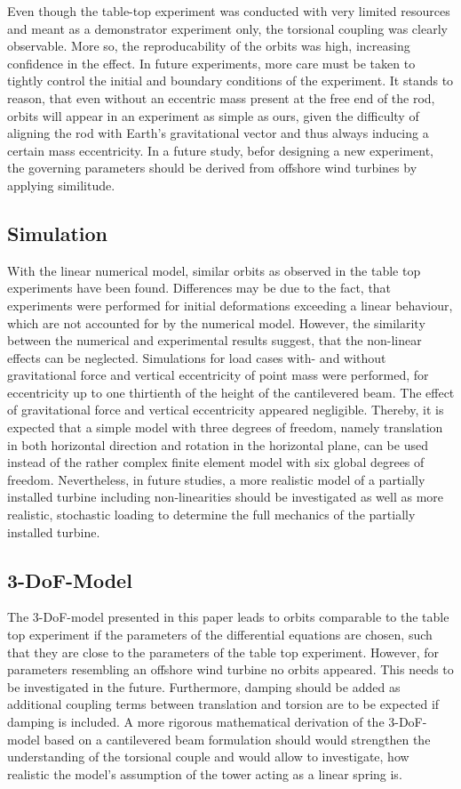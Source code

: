 \documentclass{article}
\begin{document}
Even though the table-top experiment was conducted with very limited resources and meant as a demonstrator experiment only, the torsional coupling was clearly observable. More so, the reproducability of the orbits was high, increasing confidence in the effect. In future experiments, more care must be taken to tightly control the initial and boundary conditions of the experiment. It stands to reason, that even without an eccentric mass present at the free end of the rod, orbits will appear in an experiment as simple as ours, given the difficulty of aligning the rod with Earth's gravitational vector and thus always inducing a certain mass eccentricity. In a future study, befor designing a new experiment, the governing parameters should be derived from offshore wind turbines by applying similitude. 

\subsection{Simulation}

With the linear numerical model, similar orbits as observed in the table top experiments have been found. Differences may be due to the fact, that experiments were performed for initial deformations exceeding a linear behaviour, which are not accounted for by the numerical model. However, the similarity between the numerical and experimental results suggest, that the non-linear effects can be neglected. Simulations for load cases with- and without gravitational force and vertical eccentricity of point mass were performed, for eccentricity up to one thirtienth of the height of the cantilevered beam. The effect of  gravitational force and vertical eccentricity appeared negligible. Thereby, it is expected that a simple model with three degrees of freedom, namely translation in both horizontal direction and rotation in the horizontal plane, can be used instead of the rather complex finite element model with six global degrees of freedom. Nevertheless, in future studies, a more realistic model of a partially installed turbine including non-linearities should be investigated as well as more realistic, stochastic loading to determine the full mechanics of the partially installed turbine.

\subsection{3-DoF-Model}

The 3-DoF-model presented in this paper leads to orbits comparable to the table top experiment if the parameters of the differential equations are chosen, such that they are close to the parameters of the table top experiment. However, for parameters resembling an offshore wind turbine no orbits appeared. This needs to be investigated in the future. Furthermore, damping should be added as additional coupling terms between translation and torsion are to be expected if damping is included. A more rigorous mathematical derivation of the 3-DoF-model based on a cantilevered beam formulation should would strengthen the understanding of the torsional couple and would allow to investigate, how realistic the model's assumption of the tower acting as a linear spring is. 
\end{document}
